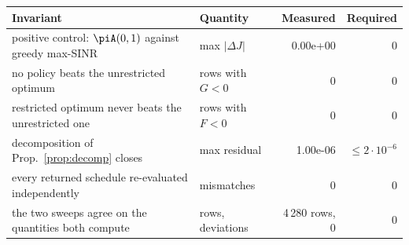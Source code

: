 \footnotesize
\begin{tabular}{@{}p{46mm}p{20mm}rr@{}}
\toprule
Invariant & Quantity & Measured & Required \\
\midrule
positive control: $\piA(0,1)$ against greedy max-SINR & max $|\Delta J|$ & 0.00e+00 & $0$ \\
no policy beats the unrestricted optimum & rows with $G<0$ & 0 & $0$ \\
restricted optimum never beats the unrestricted one & rows with $F<0$ & 0 & $0$ \\
decomposition of Prop.~\ref{prop:decomp} closes & max residual & 1.00e-06 & $\le 2\cdot 10^{-6}$ \\
every returned schedule re-evaluated independently & mismatches & 0 & $0$ \\
the two sweeps agree on the quantities both compute & rows, deviations & 4\,280 rows, 0 & $0$ \\
\bottomrule
\end{tabular}
